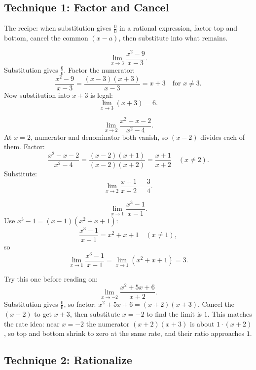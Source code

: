 \subsection{Technique 1: Factor and Cancel}
\label{ch07:factor}

The recipe: when substitution gives $\frac00$ in a rational
expression, factor top and bottom, cancel the common $(x-a)$, then substitute
into what remains.

\begin{example}
\label{ch07:ex-factor1}
\[
  \lim_{x\to 3} \frac{x^{2}-9}{x-3}.
\]
Substitution gives $\frac{0}{0}$. Factor the numerator:
\[
  \frac{x^{2}-9}{x-3} = \frac{(x-3)(x+3)}{x-3} = x+3
  \quad\text{for } x\neq 3.
\]
Now substitution into $x+3$ is legal:
\[
  \lim_{x\to 3}(x+3) = 6.
\]
\end{example}

\begin{example}
\label{ch07:ex-factor2}
\[
  \lim_{x\to 2} \frac{x^{2}-x-2}{x^{2}-4}.
\]
At $x=2$, numerator and denominator both vanish, so $(x-2)$ divides each of them. Factor:
\[
  \frac{x^{2}-x-2}{x^{2}-4}
  = \frac{(x-2)(x+1)}{(x-2)(x+2)}
  = \frac{x+1}{x+2}
  \quad (x\neq 2).
\]
Substitute:
\[
  \lim_{x\to 2}\frac{x+1}{x+2} = \frac{3}{4}.
\]
\end{example}

\begin{example}
\label{ch07:ex-factor3}
\[
  \lim_{x\to 1}\frac{x^{3}-1}{x-1}.
\]
Use $x^{3}-1 = (x-1)(x^{2}+x+1)$:
\[
  \frac{x^{3}-1}{x-1} = x^{2}+x+1 \quad (x\neq 1),
\]
so
\[
  \lim_{x\to 1}\frac{x^{3}-1}{x-1} = \lim_{x\to 1}(x^{2}+x+1) = 3.
\]
\end{example}

\begin{labbox}
Try this one before reading on:
\[
  \lim_{x\to -2}\frac{x^{2}+5x+6}{x+2}.
\]
Substitution gives $\frac{0}{0}$, so factor: $x^{2}+5x+6=(x+2)(x+3)$. Cancel
the $(x+2)$ to get $x+3$, then substitute $x=-2$ to find the limit is $1$. This
matches the rate idea: near $x=-2$ the numerator $(x+2)(x+3)$ is about
$1\cdot(x+2)$, so top and bottom shrink to zero at the same rate, and their
ratio approaches $1$.
\end{labbox}

\subsection{Technique 2: Rationalize}
\label{ch07:rationalize}

